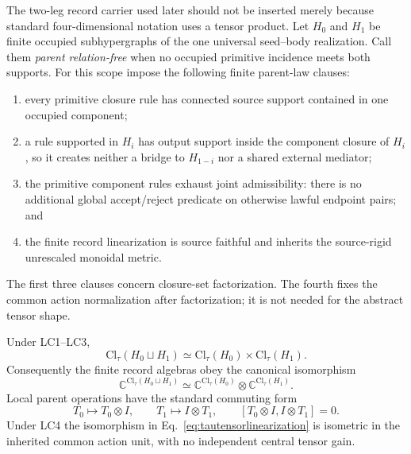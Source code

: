 The two-leg record carrier used later should not be inserted merely because
standard four-dimensional notation uses a tensor product.  Let $H_0$ and
$H_1$ be finite occupied subhypergraphs of the one universal seed--body
realization.  Call them \emph{parent relation-free} when no occupied primitive
incidence meets both supports.  For this scope impose the following finite
parent-law clauses:
\begin{enumerate}[label=(LC\arabic*),nosep]
\item every primitive closure rule has connected source support contained in
  one occupied component;
\item a rule supported in $H_i$ has output support inside the component
  closure of $H_i$, so it creates neither a bridge to $H_{1-i}$ nor a shared
  external mediator;
\item the primitive component rules exhaust joint admissibility: there is no
  additional global accept/reject predicate on otherwise lawful endpoint
  pairs; and
\item the finite record linearization is source faithful and inherits the
  source-rigid unrescaled monoidal metric.
\end{enumerate}
The first three clauses concern closure-set factorization.  The fourth fixes
the common action normalization after factorization; it is not needed for the
abstract tensor shape.

\begin{theorem}
\label{thm:taustandardcomposition}
Under LC1--LC3,
\begin{equation}
 \boxed{
 \mathrm{Cl}_\tau(H_0\sqcup H_1)
 \simeq
 \mathrm{Cl}_\tau(H_0)\times\mathrm{Cl}_\tau(H_1).}
 \label{eq:tauclosureproduct}
\end{equation}
Consequently the finite record algebras obey the canonical isomorphism
\begin{equation}
 \boxed{
 \mathbb C^{\mathrm{Cl}_\tau(H_0\sqcup H_1)}
 \simeq
 \mathbb C^{\mathrm{Cl}_\tau(H_0)}
 \otimes
 \mathbb C^{\mathrm{Cl}_\tau(H_1)}.}
 \label{eq:tautensorlinearization}
\end{equation}
Local parent operations have the standard commuting form
\begin{equation}
 T_0\longmapsto T_0\otimes I,\qquad
 T_1\longmapsto I\otimes T_1,\qquad
 [T_0\otimes I,I\otimes T_1]=0.
 \label{eq:taulocaloperators}
\end{equation}
Under LC4 the isomorphism in
Eq.~\eqref{eq:tautensorlinearization} is isometric in the inherited common
action unit, with no independent central tensor gain.
\end{theorem}

